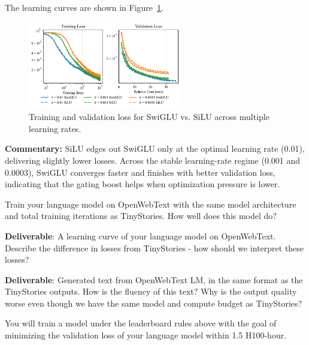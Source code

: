 \begin{answer}

The learning curves are shown in Figure~\ref{fig:swiglu_ablation}.

\begin{figure}[!htb]
    \centering
    \includegraphics[width=0.6\textwidth]{images/swiglu_ablation_experiments.pdf}
    \caption{Training and validation loss for SwiGLU vs. SiLU across multiple learning rates.}
    \label{fig:swiglu_ablation}
\end{figure}

\textbf{Commentary:} SiLU edges out SwiGLU only at the optimal learning rate (0.01), delivering slightly lower losses. Across the stable learning-rate regime (0.001 and 0.0003), SwiGLU converges faster and finishes with better validation loss, indicating that the gating boost helps when optimization pressure is lower.

\end{answer}


Train your language model on OpenWebText with the same model architecture and total training iterations as TinyStories. How well does this model do?

\textbf{Deliverable}: A learning curve of your language model on OpenWebText. Describe the difference in losses from TinyStories - how should we interpret these losses?

\textbf{Deliverable}: Generated text from OpenWebText LM, in the same format as the TinyStories outputs. How is the fluency of this text? Why is the output quality worse even though we have the same model and compute budget as TinyStories?

\begin{answer}

\end{answer}


You will train a model under the leaderboard rules above with the goal of minimizing the validation loss of your language model within 1.5 H100-hour.

